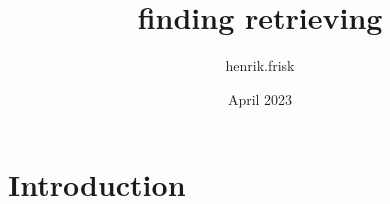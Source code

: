 \documentclass{article}
\title{finding retrieving}
\author{henrik.frisk }
\date{April 2023}
\begin{document}
\maketitle

\section{Introduction}
\end{document}
